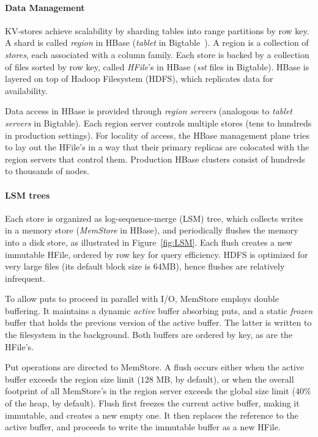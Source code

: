 \paragraph{Data Management}
KV-stores achieve scalability by sharding tables into range partitions 
by row key. A shard is called {\em region\/} in HBase (\emph{tablet} in Bigtable~\cite{Chang2008}). 
A region is a collection of \emph{stores}, each associated with a column family. 
Each store is backed by a collection of files sorted by row key, called \emph{HFile}'s in HBase 
(\emph{sst} files in Bigtable). HBase is layered on top of Hadoop Filesystem (HDFS), which 
replicates data for availability. 

Data access in HBase is provided through {\em region servers} (analogous to {\em tablet servers}
in Bigtable). Each region server controls multiple stores (tens to hundreds in production settings). 
For locality of access, the HBase management plane tries to lay out the HFile's in a way that their 
primary replicas are colocated with the region servers that control them. Production HBase clusters
consist of hundreds to thousands of nodes. 

\paragraph{LSM trees}
Each store is organized as log-sequence-merge (LSM) tree, which collects writes in a memory store 
(\emph{MemStore} in HBase), and periodically flushes the memory into a disk store, as illustrated in 
Figure~\ref{fig:LSM}. Each flush creates a new immutable HFile, ordered by row key for query efficiency. 
HDFS is optimized for very large files (its default block size is $64$MB), hence flushes are relatively infrequent. 

To allow puts to proceed in parallel with I/O, MemStore employs double buffering. 
It maintains a dynamic \emph{active} buffer absorbing puts, and a static \emph{frozen}
buffer that holds the previous version of the active buffer. The latter is written to the 
filesystem in the background. Both buffers are ordered by key, as are the HFile's.  

Put operations are directed to MemStore. A flush occurs either when the active buffer 
exceeds the region size limit ($128$ MB, by default), or when the overall footprint of all MemStore's
in the region server exceeds the global size limit ($40\%$ of the heap, by default). 
Flush first freezes the current active buffer, making it immutable, and creates a new empty one.
It then replaces the reference to the active buffer, and proceeds to write the immutable buffer 
as a new HFile. 

